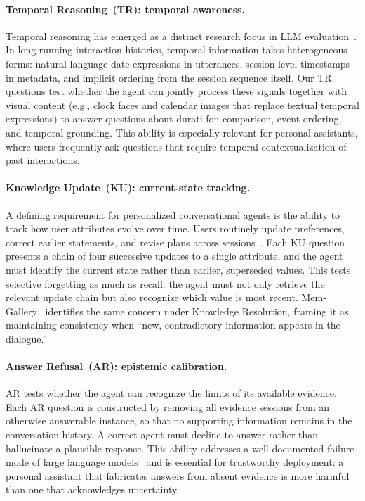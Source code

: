 \documentclass{article}
\begin{document}
\paragraph{Temporal Reasoning~(TR): temporal awareness.}
Temporal reasoning has emerged as a distinct research focus in LLM evaluation~\cite{wang2023cola,wang2022subeventwriter,wei2025time,wu2025longmemevalbenchmarkingchatassistants}. In long-running interaction histories, temporal information takes heterogeneous forms: natural-language date expressions in utterances, session-level timestamps in metadata, and implicit ordering from the session sequence itself. Our TR questions test whether the agent can jointly process these signals together with visual content (e.g., clock faces and calendar images that replace textual temporal expressions) to answer questions about durati fon comparison, event ordering, and temporal grounding. This ability is especially relevant for personal assistants, where users frequently ask questions that require temporal contextualization of past interactions.

\paragraph{Knowledge Update~(KU): current-state tracking.}
A defining requirement for personalized conversational agents is the ability to track how user attributes evolve over time. Users routinely update preferences, correct earlier statements, and revise plans across sessions~\cite{xu2024knowledge}. Each KU question presents a chain of four successive updates to a single attribute, and the agent must identify the current state rather than earlier, superseded values. This tests selective forgetting as much as recall: the agent must not only retrieve the relevant update chain but also recognize which value is most recent. Mem-Gallery~\cite{memgallery} identifies the same concern under Knowledge Resolution, framing it as maintaining consistency when ``new, contradictory information appears in the dialogue.''

\paragraph{Answer Refusal~(AR): epistemic calibration.}
AR tests whether the agent can recognize the limits of its available evidence. Each AR question is constructed by removing all evidence sessions from an otherwise answerable instance, so that no supporting information remains in the conversation history. A correct agent must decline to answer rather than hallucinate a plausible response. This ability addresses a well-documented failure mode of large language models~\cite{zhang2024rtuning} and is essential for trustworthy deployment: a personal assistant that fabricates answers from absent evidence is more harmful than one that acknowledges uncertainty.
\end{document}
